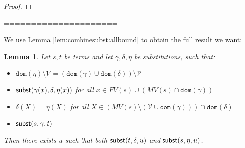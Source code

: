 \documentclass{lmcs}
\theoremstyle{theorem}\newtheorem{theorem}{Theorem}
\theoremstyle{theorem}\newtheorem{lemma}[theorem]{Lemma}
\theoremstyle{theorem}\newtheorem{corollary}[theorem]{Corollary}
\theoremstyle{definition}\newtheorem{definition}[theorem]{Definition}
\theoremstyle{definition}\newtheorem{example}[theorem]{Example}
\newcommand{\V}{\mathcal{V}}
\newcommand{\M}{\mathcal{M}}
\newcommand{\FV}{\mathit{FV}}
\newcommand{\FMV}{\mathit{MV}}
\newcommand{\domain}{\mathtt{dom}}
\newcommand{\avar}{x}
\newcommand{\Avar}{X}
\newcommand{\abs}[2]{\lambda #1.#2}
\newcommand{\meta}[2]{#1\langle#2\rangle}
\begin{document}
\begin{proof}
\end{proof}

=====================

We use Lemma \ref{lem:combinesubst:allbound} to obtain the full result we want:

\begin{lemma}\label{lem:combinesubst}
Let $s,t$ be terms and let $\gamma,\delta,\eta$ be substitutions, such that:
\begin{itemize}
\item $\domain(\eta) \setminus \V = (\domain(\gamma) \cup \domain(\delta))
  \setminus \V$
\item $\subrel{\gamma(\avar),\delta,\eta(\avar)}$ for all $\avar \in \FV(s)
  \cup (\FMV(s) \cap \domain(\gamma))$
\item $\delta(\Avar) = \eta(\Avar)$ for all $\Avar \in (\FMV(s) \setminus
  (\V \cup \domain(\gamma))) \cap \domain(\delta)$
\item $\mathsf{subst}(s,\gamma,t)$
\end{itemize}
Then there exists $u$ such that both $\mathsf{subst}(t,\delta,u)$ and
$\mathsf{subst}(s,\eta,u)$.
\end{lemma}
\end{document}
